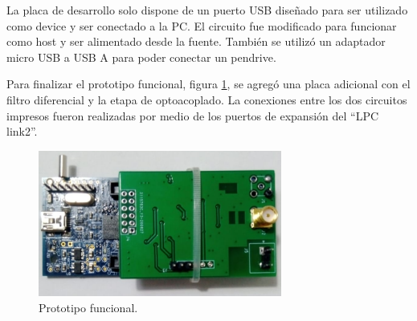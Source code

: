 La placa de desarrollo solo dispone de un puerto USB diseñado para ser utilizado como device y ser conectado a la PC. El circuito fue modificado para funcionar como host y ser alimentado desde la fuente. También se utilizó un adaptador micro USB a USB A para poder conectar un pendrive.  

Para finalizar el prototipo funcional, figura \ref{fig:hardProto}, se agregó una placa adicional con el filtro diferencial y la etapa de optoacoplado. La conexiones entre los dos circuitos impresos fueron realizadas por medio de los puertos de expansión del \enquote{LPC link2}. 

\begin{figure}[ht]
	\centering
	\includegraphics[width=80mm]{./Figures/hardProto.png}
	\caption{Prototipo funcional.}
	\label{fig:hardProto}
\end{figure}